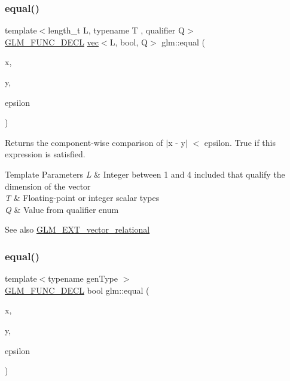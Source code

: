 \subsubsection{\texorpdfstring{equal()}{equal()}\hspace{0.1cm}{\footnotesize\ttfamily [2/3]}}
{\footnotesize\ttfamily template$<$length\+\_\+t L, typename T , qualifier Q$>$ \\
\hyperlink{setup_8hpp_ab2d052de21a70539923e9bcbf6e83a51}{G\+L\+M\+\_\+\+F\+U\+N\+C\+\_\+\+D\+E\+CL} \hyperlink{structglm_1_1vec}{vec}$<$L, bool, Q$>$ glm\+::equal (\begin{DoxyParamCaption}\item[{\hyperlink{structglm_1_1vec}{vec}$<$ L, T, Q $>$ const \&}]{x,  }\item[{\hyperlink{structglm_1_1vec}{vec}$<$ L, T, Q $>$ const \&}]{y,  }\item[{\hyperlink{structglm_1_1vec}{vec}$<$ L, T, Q $>$ const \&}]{epsilon }\end{DoxyParamCaption})}

Returns the component-\/wise comparison of $\vert$x -\/ y$\vert$ $<$ epsilon. True if this expression is satisfied.


\begin{DoxyTemplParams}{Template Parameters}
{\em L} & Integer between 1 and 4 included that qualify the dimension of the vector \\
\hline
{\em T} & Floating-\/point or integer scalar types \\
\hline
{\em Q} & Value from qualifier enum\\
\hline
\end{DoxyTemplParams}
\begin{DoxySeeAlso}{See also}
\hyperlink{group__ext__vector__relational}{G\+L\+M\+\_\+\+E\+X\+T\+\_\+vector\+\_\+relational} 
\end{DoxySeeAlso}
\mbox{\label{group__ext__vector__relational_gac4ae021e79693174e4de6560d159b33a}} 
\subsubsection{\texorpdfstring{equal()}{equal()}\hspace{0.1cm}{\footnotesize\ttfamily [3/3]}}
{\footnotesize\ttfamily template$<$typename gen\+Type $>$ \\
\hyperlink{setup_8hpp_ab2d052de21a70539923e9bcbf6e83a51}{G\+L\+M\+\_\+\+F\+U\+N\+C\+\_\+\+D\+E\+CL} bool glm\+::equal (\begin{DoxyParamCaption}\item[{gen\+Type const \&}]{x,  }\item[{gen\+Type const \&}]{y,  }\item[{gen\+Type const \&}]{epsilon }\end{DoxyParamCaption})}

